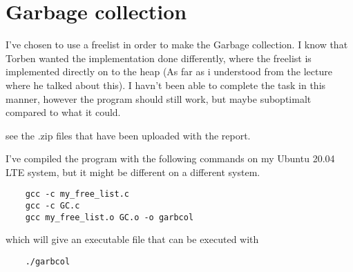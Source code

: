 \section{Garbage collection}
I've chosen to use a freelist in order to make the Garbage collection. I know
that Torben wanted the implementation done differently, where the freelist is
implemented directly on to the heap (As far as i understood from the lecture where
he talked about this). I havn't been able to complete the task in this manner, however
the program should still work, but maybe suboptimalt compared to what it could.

see the .zip files that have been uploaded with the report.

I've compiled the program with the following commands on my Ubuntu 20.04 LTE system,
but it might be different on a different system.

\begin{verbatim}
    gcc -c my_free_list.c
    gcc -c GC.c
    gcc my_free_list.o GC.o -o garbcol
\end{verbatim}

which will give an executable file that can be executed with

\begin{verbatim}
    ./garbcol
\end{verbatim}